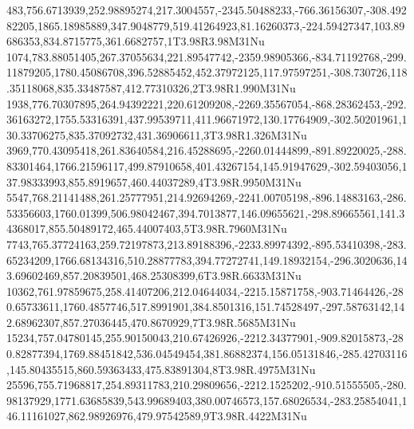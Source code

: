 483,756.6713939,252.98895274,217.3004557,-2345.50488233,-766.36156307,-308.49282205,1865.18985889,347.9048779,519.41264923,81.16260373,-224.59427347,103.89686353,834.8715775,361.6682757,1T3.98R3.98M31Nu
1074,783.88051405,267.37055634,221.89547742,-2359.98905366,-834.71192768,-299.11879205,1780.45086708,396.52885452,452.37972125,117.97597251,-308.730726,118.35118068,835.33487587,412.77310326,2T3.98R1.990M31Nu
1938,776.70307895,264.94392221,220.61209208,-2269.35567054,-868.28362453,-292.36163272,1755.53316391,437.99539711,411.96671972,130.17764909,-302.50201961,130.33706275,835.37092732,431.36906611,3T3.98R1.326M31Nu
3969,770.43095418,261.83640584,216.45288695,-2260.01444899,-891.89220025,-288.83301464,1766.21596117,499.87910658,401.43267154,145.91947629,-302.59403056,137.98333993,855.8919657,460.44037289,4T3.98R.9950M31Nu
5547,768.21141488,261.25777951,214.92694269,-2241.00705198,-896.14883163,-286.53356603,1760.01399,506.98042467,394.7013877,146.09655621,-298.89665561,141.34368017,855.50489172,465.44007403,5T3.98R.7960M31Nu
7743,765.37724163,259.72197873,213.89188396,-2233.89974392,-895.53410398,-283.65234209,1766.68134316,510.28877783,394.77272741,149.18932154,-296.3020636,143.69602469,857.20839501,468.25308399,6T3.98R.6633M31Nu
10362,761.97859675,258.41407206,212.04644034,-2215.15871758,-903.71464426,-280.65733611,1760.4857746,517.8991901,384.8501316,151.74528497,-297.58763142,142.68962307,857.27036445,470.8670929,7T3.98R.5685M31Nu
15234,757.04780145,255.90150043,210.67426926,-2212.34377901,-909.82015873,-280.82877394,1769.88451842,536.04549454,381.86882374,156.05131846,-285.42703116,145.80435515,860.59363433,475.83891304,8T3.98R.4975M31Nu
25596,755.71968817,254.89311783,210.29809656,-2212.1525202,-910.51555505,-280.98137929,1771.63685839,543.99689403,380.00746573,157.68026534,-283.25854041,146.11161027,862.98926976,479.97542589,9T3.98R.4422M31Nu

